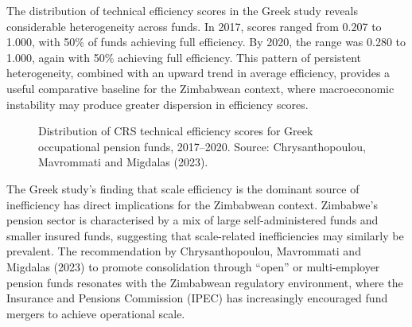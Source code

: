 \documentclass[12pt,a4paper]{article}
\begin{document}
The distribution of technical efficiency scores in the Greek study reveals considerable heterogeneity across funds. In 2017, scores ranged from 0.207 to 1.000, with 50\% of funds achieving full efficiency. By 2020, the range was 0.280 to 1.000, again with 50\% achieving full efficiency. This pattern of persistent heterogeneity, combined with an upward trend in average efficiency, provides a useful comparative baseline for the Zimbabwean context, where macroeconomic instability may produce greater dispersion in efficiency scores.

\begin{figure}[H]
\centering
{}
\caption{Distribution of CRS technical efficiency scores for Greek occupational pension funds, 2017--2020. Source: Chrysanthopoulou, Mavrommati and Migdalas (2023).}
\label{fig:greek_distribution}
\end{figure}

The Greek study's finding that scale efficiency is the dominant source of inefficiency has direct implications for the Zimbabwean context. Zimbabwe's pension sector is characterised by a mix of large self-administered funds and smaller insured funds, suggesting that scale-related inefficiencies may similarly be prevalent. The recommendation by Chrysanthopoulou, Mavrommati and Migdalas (2023) to promote consolidation through ``open'' or multi-employer pension funds resonates with the Zimbabwean regulatory environment, where the Insurance and Pensions Commission (IPEC) has increasingly encouraged fund mergers to achieve operational scale.
\end{document}
